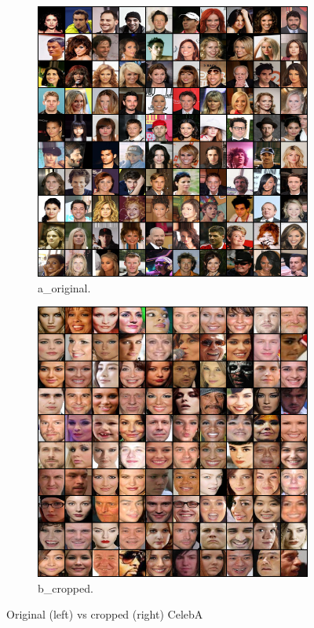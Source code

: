 \begin{figure}[!htbp]
   \centering
\begin{subfigure}[t]{0.48\textwidth}
   \includegraphics[width=\textwidth,center]{2019-05-06/celeba-crop/a_original.png}
   \caption{a_original.}
   \label{fig:2019-05-06_celeba-crop-a}
\end{subfigure}
\begin{subfigure}[t]{0.48\textwidth}
   \includegraphics[width=\textwidth,center]{2019-05-06/celeba-crop/b_cropped.png}
   \caption{b_cropped.}
   \label{fig:2019-05-06_celeba-crop-b}
\end{subfigure}
   \caption{Original (left) vs cropped (right) CelebA}
   \label{fig:2019-05-06_celeba-crop}
\end{figure}